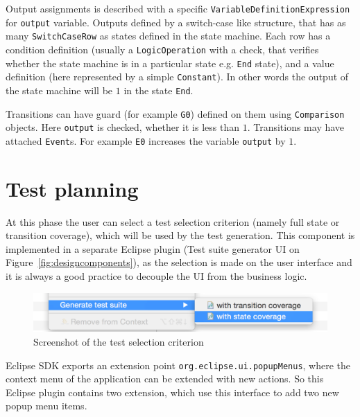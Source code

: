 Output assignments is described with a specific \texttt{VariableDefinitionExpression} for \texttt{output} variable. Outputs defined by a switch-case like structure, that has as many \texttt{SwitchCaseRow} as states defined in the state machine. Each row has a condition definition (usually a \texttt{LogicOperation} with a check, that verifies whether the state machine is in a particular state e.g. \texttt{End} state), and a value definition (here represented by a simple \texttt{Constant}). In other words the output of the state machine will be $1$ in the state \texttt{End}.

Transitions can have guard (for example \texttt{G0}) defined on them using \texttt{Comparison} objects. Here \texttt{output} is checked, whether it is less than $1$. Transitions may have attached \texttt{Event}s. For example \texttt{E0} increases the variable \texttt{output} by $1$.


\section{Test planning}
\label{sec:testplanningimplementation}

At this phase the user can select a test selection criterion (namely full state or transition coverage), which will be used by the test generation. This component is implemented in a separate Eclipse plugin (Test suite generator UI on Figure~\ref{fig:designcomponents}), as the selection is made on the user interface and it is always a good practice to decouple the UI from the business logic.
	
\begin{figure}[htp]
\centering
\includegraphics[scale=0.4]{figures/implementation_screenshot}
\caption{Screenshot of the test selection criterion}
\label{fig:implementation_screenshot}
\end{figure}
	
Eclipse SDK exports an extension point \texttt{org.eclipse.ui.popupMenus}, where the context menu of the application can be extended with new actions. So this Eclipse plugin contains two extension, which use this interface to add two new popup menu items.
	
	
